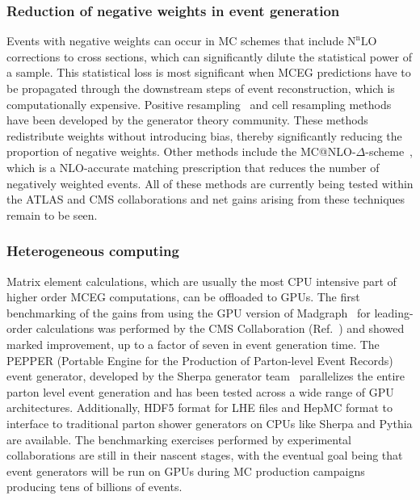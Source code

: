 \documentclass[10pt,a4paper]{article}
\begin{document}
\subsubsection{Reduction of negative weights in event
generation}\label{reduction-of-negative-weights-in-event-generation}

Events with negative weights can occur in MC schemes that include
$\text{N}^\text{n}\text{LO}$ corrections to cross sections, which can significantly dilute
the statistical power of a sample. This statistical loss is most
significant when MCEG predictions have to be propagated through the
downstream steps of event reconstruction, which is computationally
expensive. Positive
resampling~\cite{Andersen:2020sjs} and
cell resampling
methods~\cite{Andersen:2021mvw} have been
developed by the generator theory community. These methods redistribute
weights without introducing bias, thereby significantly reducing the
proportion of negative weights. Other methods include the
MC@NLO-$\Delta$-scheme~\cite{Frederix:2020trv},
which is a NLO-accurate matching prescription that reduces the number of
negatively weighted events. All of these methods are currently being
tested within the ATLAS and CMS collaborations and net gains arising
from these techniques remain to be seen.

\subsubsection{Heterogeneous computing}\label{heterogeneous-computing}

Matrix element calculations, which are usually the most CPU intensive
part of higher order MCEG computations, can be offloaded to GPUs. The
first benchmarking of the gains from using the GPU version of
Madgraph~\cite{Alwall:2014hca,MadgraphOnGPU}
for leading-order calculations was performed by the CMS Collaboration
(Ref.~\cite{CMS-DP-2024-086}) and showed
marked improvement, up to a factor of seven in event generation time.
The PEPPER (Portable Engine for the Production of Parton-level Event
Records)~\cite{Bothmann:2023gew} event
generator, developed by the Sherpa generator
team~\cite{Sherpa:2019gpd} parallelizes
the entire parton level event generation and has been tested across a
wide range of GPU architectures. Additionally, HDF5 format for LHE files
and HepMC format to interface to traditional parton shower generators on
CPUs like Sherpa and Pythia are available. The benchmarking exercises
performed by experimental collaborations are still in their nascent
stages, with the eventual goal being that event generators will be run
on GPUs during MC production campaigns producing tens of billions of
events.
\end{document}
